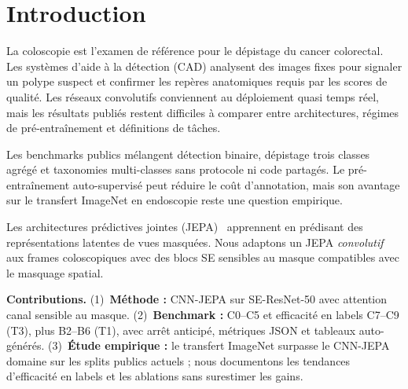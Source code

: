 \section{Introduction}
\label{sec:intro}

La coloscopie est l'examen de référence pour le dépistage du cancer colorectal.
Les systèmes d'aide à la détection (CAD) analysent des images fixes pour signaler un polype suspect et confirmer les repères anatomiques requis par les scores de qualité.
Les réseaux convolutifs conviennent au déploiement quasi temps réel, mais les résultats publiés restent difficiles à comparer entre architectures, régimes de pré-entraînement et définitions de tâches.

Les benchmarks publics mélangent détection binaire, dépistage trois classes agrégé et taxonomies multi-classes sans protocole ni code partagés.
Le pré-entraînement auto-supervisé peut réduire le coût d'annotation, mais son avantage sur le transfert ImageNet en endoscopie reste une question empirique.

Les architectures prédictives jointes (JEPA)~\cite{lecun2022path,assran2023ijepa} apprennent en prédisant des représentations latentes de vues masquées.
Nous adaptons un JEPA \emph{convolutif} aux frames coloscopiques avec des blocs SE sensibles au masque compatibles avec le masquage spatial.


\textbf{Contributions.}
(1)~\textbf{Méthode :} CNN-JEPA sur SE-ResNet-50 avec attention canal sensible au masque.
(2)~\textbf{Benchmark :} C0--C5 et efficacité en labels C7--C9 (T3), plus B2--B6 (T1), avec arrêt anticipé, métriques JSON et tableaux auto-générés.
(3)~\textbf{Étude empirique :} le transfert ImageNet surpasse le CNN-JEPA domaine sur les splits publics actuels ; nous documentons les tendances d'efficacité en labels et les ablations sans surestimer les gains.

